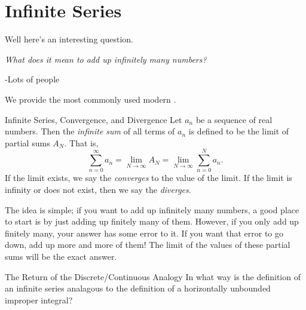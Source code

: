 \section{Infinite Series}
Well here's an interesting question.
\begin{center}
\emph{What does it mean to add up infinitely many numbers?}

\parindent \parindent -Lots of people
\end{center}

We provide the most commonly used modern .

\begin{definition}{Infinite Series, Convergence, and Divergence}
Let $a_n$ be a sequence of real numbers.  Then the \emph{infinite sum} of all terms of $a_n$ is defined to be the limit of partial sums $A_N$.  That is, 
$$\sum_{n=0}^\infty a_n = \lim_{N\rightarrow \infty} A_N = \lim_{N\rightarrow \infty} \sum_{n=0}^N a_n. $$
If the limit exists, we say the  \emph{converges} to the value of the limit.  If the limit is infinity or does not exist, then we say the  \emph{diverges}. 
\end{definition}

The idea is simple; if you want to add up infinitely many numbers, a good place to start is by just adding up finitely many of them.  However, if you only add up finitely many, your answer has some error to it.  If you want that error to go down, add up more and more of them!  The limit of the values of these partial sums will be the exact answer.

\begin{exercise}{The Return of the Discrete/Continuous Analogy \Coffeecup \Coffeecup \Coffeecup} In what way is the definition of an infinite series analagous to the definition of a horizontally unbounded improper integral?
\end{exercise}

